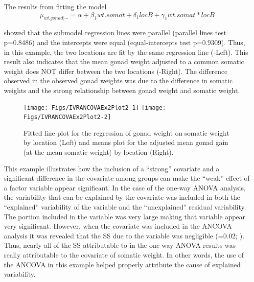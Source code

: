 \documentclass[10pt,openany]{book}\usepackage[]{graphicx}\usepackage[]{color}
\newenvironment{knitrout}{}{} %
\begin{document}
The results from fitting the model
\[ \mu_{wt.gonad|\cdots}=\alpha+\beta_{1}wt.somat+\delta_{1}locB+\gamma_{1}wt.somat*locB \]

showed that the submodel regression lines were parallel (parallel lines test p=0.8486) and the intercepts were equal (equal-intercepts test p=0.9309).  Thus, in this example, the two locations are fit by the same regression line (-Left).  This result also indicates that the mean gonad weight adjusted to a common somatic weight does NOT differ between the two locations (-Right).  The difference observed in the observed gonad weights was due to the difference in somatic weights and the strong relationship between gonad weight and somatic weight.

\begin{knitrout}
\color{fgcolor}\begin{figure}[h]

{\centering \texttt{[image: Figs/IVRANCOVAEx2Plot2-1]} 
\texttt{[image: Figs/IVRANCOVAEx2Plot2-2]} 

}

\caption[Fitted line plot for the regression of gonad weight on somatic weight by location (Left) and means plot for the adjusted mean gonad gain (at the mean somatic weight) by location (Right)]{Fitted line plot for the regression of gonad weight on somatic weight by location (Left) and means plot for the adjusted mean gonad gain (at the mean somatic weight) by location (Right).}\label{fig:IVRANCOVAEx2Plot2}
\end{figure}


\end{knitrout}

This example illustrates how the inclusion of a ``strong'' covariate and a significant difference in the covariate among groups can make the ``weak'' effect of a factor variable appear significant.  In the case of the one-way ANOVA analysis, the variability that can be explained by the covariate was included in both the ``explained'' variability of the  variable and the ``unexplained'' residual variability.  The portion included in the  variable was very large making that variable appear very significant.  However, when the covariate was included in the ANCOVA analysis it was revealed that the SS due to the  variable was negligible (=0.02; ).  Thus, nearly all of the SS attributable to  in the one-way ANOVA results was really attributable to the covariate of somatic weight.  In other words, the use of the ANCOVA in this example helped properly attribute the cause of explained variability.
\end{document}

